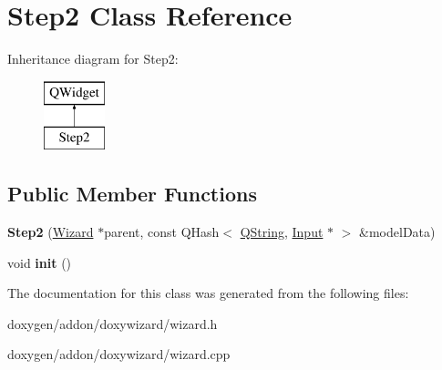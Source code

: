 \hypertarget{class_step2}{}\section{Step2 Class Reference}
\label{class_step2}
Inheritance diagram for Step2\+:\begin{figure}[H]
\begin{center}
\leavevmode
\includegraphics[height=2.000000cm]{class_step2}
\end{center}
\end{figure}
\subsection*{Public Member Functions}
\begin{DoxyCompactItemize}
\item 
\mbox{\label{class_step2_a4c0b14dabd0853505239520cca925149}} 
{\bfseries Step2} (\mbox{\hyperlink{class_wizard}{Wizard}} $\ast$parent, const Q\+Hash$<$ \mbox{\hyperlink{class_q_string}{Q\+String}}, \mbox{\hyperlink{class_input}{Input}} $\ast$ $>$ \&model\+Data)
\item 
\mbox{\label{class_step2_a3765417a8be2d29748fe77b02f3d6c76}} 
void {\bfseries init} ()
\end{DoxyCompactItemize}


The documentation for this class was generated from the following files\+:\begin{DoxyCompactItemize}
\item 
doxygen/addon/doxywizard/wizard.\+h\item 
doxygen/addon/doxywizard/wizard.\+cpp\end{DoxyCompactItemize}
